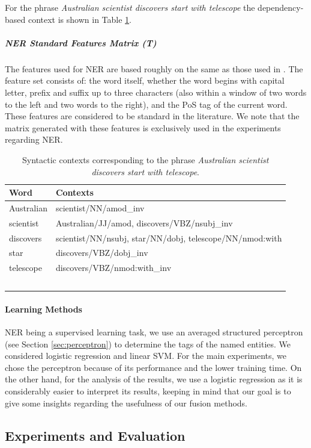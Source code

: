 For the phrase \textit{Australian scientist discovers start with telescope} the dependency-based context is shown in Table \ref{tab:syn-contexts}.
\subparagraph{NER Standard Features Matrix (T)}
The features used for NER are based roughly on the same as those used in \cite{Daume2006,Balasuriya2009}. The feature set consists of: the word itself, whether the word begins with capital letter, prefix and suffix up to three characters (also within a window of two words to the left and two words to the right), and the PoS tag of the current word. These features are considered to be standard in the literature. We note that the matrix generated with these features is exclusively used in the experiments regarding NER.	

\begin{table}
\centering
\begin{tabular}{ll}
\hline 
 Word & Contexts \\ 
\hline 
Australian & scientist/NN/amod\_inv \\ 
scientist  &  Australian/JJ/amod, discovers/VBZ/nsubj\_inv\\ 
discovers & scientist/NN/nsubj, star/NN/dobj, telescope/NN/nmod:with \\ 
star & discovers/VBZ/dobj\_inv \\ 
telescope  &  discovers/VBZ/nmod:with\_inv \\ 
\hline \
\end{tabular} 
\caption{Syntactic contexts corresponding to the phrase \textit{Australian scientist discovers start with telescope}.}
\label{tab:syn-contexts}
\end{table}


\paragraph{Learning Methods}
NER being a supervised learning task, we use an averaged structured perceptron  \cite{Collins2002,Daume2006} (see Section \ref{sec:perceptron}) to determine the tags of the named entities. We considered logistic regression and linear SVM. For the main experiments, we chose the perceptron because of its performance and the lower training time. On the other hand, for the analysis of the results, we use a logistic regression as it is considerably easier to interpret its results, keeping in mind that our goal is to give some insights regarding the usefulness of our fusion methods.




\subsection{Experiments and Evaluation}
\label{chap6:expes}

